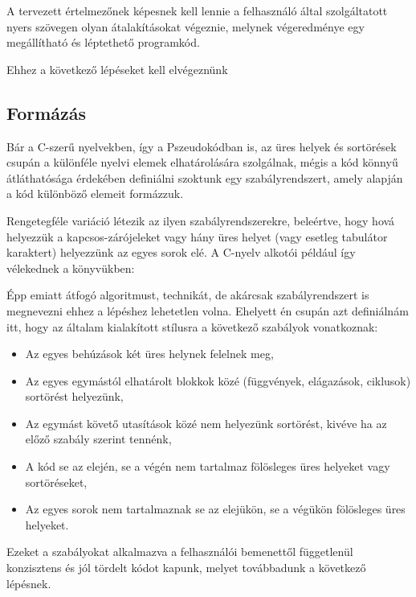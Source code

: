 A tervezett értelmezőnek képesnek kell lennie a felhasználó által szolgáltatott nyers szövegen olyan átalakításokat végeznie, melynek végeredménye egy megállítható és léptethető programkód.

Ehhez a következő lépéseket kell elvégeznünk

\subsection{Formázás}

Bár a C-szerű nyelvekben, így a Pszeudokódban is, az üres helyek és sortörések csupán a különféle nyelvi elemek elhatárolására szolgálnak, mégis a kód könnyű átláthatósága érdekében definiálni szoktunk egy szabályrendszert, amely alapján a kód különböző elemeit formázzuk.

Rengetegféle variáció létezik az ilyen szabályrendszerekre, beleértve, hogy hová helyezzük a kapcsos-zárójeleket vagy hány üres helyet (vagy esetleg tabulátor karaktert) helyezzünk az egyes sorok elé. A C-nyelv alkotói például így vélekednek a könyvükben:

\cite{kr}

Épp emiatt átfogó algoritmust, technikát, de akárcsak szabályrendszert is megnevezni ehhez a lépéshez lehetetlen volna. Ehelyett én csupán azt definiálnám itt, hogy az általam kialakított stílusra a következő szabályok vonatkoznak:

\begin{itemize}
    \item Az egyes behúzások két üres helynek felelnek meg,
    \item Az egyes egymástól elhatárolt blokkok közé (függvények, elágazások, ciklusok) sortörést helyezünk,
    \item Az egymást követő utasítások közé nem helyezünk sortörést, kivéve ha az előző szabály szerint tennénk,
    \item A kód se az elején, se a végén nem tartalmaz fölösleges üres helyeket vagy sortöréseket,
    \item Az egyes sorok nem tartalmaznak se az elejükön, se a végükön fölösleges üres helyeket.
\end{itemize}

Ezeket a szabályokat alkalmazva a felhasználói bemenettől függetlenül konzisztens és jól tördelt kódot kapunk, melyet továbbadunk a következő lépésnek.

